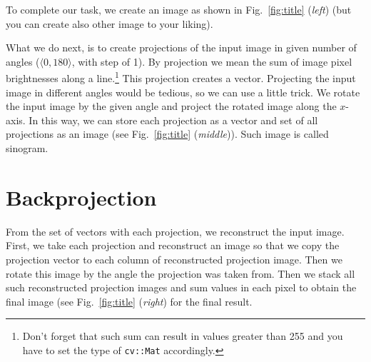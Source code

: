 \documentclass{tufte-handout}
\begin{document}
To complete our task, we create an image as shown in Fig.~\ref{fig:title} (\emph{left})
(but you can create also other image to your liking).

What we do next, is to create projections of the input image in given number of angles
($\langle 0, 180 \rangle$, with step of 1).
By projection we mean the sum of image pixel brightnesses along a line.\footnote{Don't
forget that such sum can result in values greater than 255 and you have to set the type
of \texttt{cv::Mat} accordingly.}
This projection creates a vector.
Projecting the input image in different angles would be tedious,
so we can use a little trick. We rotate the input image by the given angle and project
the rotated image along the $x$-axis.
In this way, we can store each projection as a vector and set of all projections
as an image (see Fig.~\ref{fig:title} (\emph{middle})). Such image is called sinogram.


\section{Backprojection}

From the set of vectors with each projection, we reconstruct the input image.
First, we take each projection and reconstruct an image so that we copy the projection
vector to each column of reconstructed projection image. Then we rotate this image
by the angle the projection was taken from. Then we stack all such reconstructed projection
images and sum values in each pixel to obtain the final image
(see Fig.~\ref{fig:title} (\emph{right}) for the final result.




\end{document}
